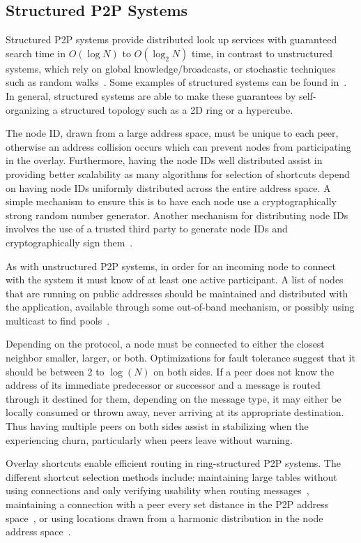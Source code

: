 \documentclass[conference]{IEEEtran}
\begin{document}
\subsection{Structured P2P Systems}
\label{structured_p2p}
Structured P2P systems provide distributed look up services with guaranteed
search time in $O(\log N)$ to $O(\log_2 N)$ time, in contrast to unstructured
systems, which rely on global knowledge/broadcasts, or stochastic techniques
such as random walks~\cite{unstructured_v_structured}.  Some examples of
structured systems can be found in~\cite{pastry, chord, symphony, kademlia,
can}.  In general, structured systems are able to make these guarantees by
self-organizing a structured topology such as a 2D ring or a hypercube.

The node ID, drawn from a large address space, must be unique to each peer,
otherwise an address collision occurs which can prevent nodes from participating
in the overlay.  Furthermore, having the node IDs well distributed assist in
providing better scalability as many algorithms for selection of shortcuts
depend on having node IDs uniformly distributed across the entire address space.
A simple mechanism to ensure this is to have each node use a cryptographically
strong random number generator.  Another mechanism for distributing node IDs
involves the use of a trusted third party to generate node IDs and
cryptographically sign them~\cite{secure_routing}.

As with unstructured P2P systems, in order for an incoming node to connect with
the system it must know of at least one active participant.  A list of nodes
that are running on public addresses should be maintained and distributed with
the application, available through some out-of-band mechanism, or possibly using
multicast to find pools~\cite{pastry}.

Depending on the protocol, a node must be connected to either the closest
neighbor smaller, larger, or both.  Optimizations for fault tolerance suggest
that it should be between 2 to $\log(N)$ on both sides.  If a peer does not
know the address of its immediate predecessor or successor and a message
is routed through it destined for them, depending on the message type, it may
either be locally consumed or thrown away, never arriving at its appropriate
destination.  Thus having multiple peers on both sides assist in stabilizing
when the experiencing churn, particularly when peers leave without warning.

Overlay shortcuts enable efficient routing in ring-structured P2P systems.  The
different shortcut selection methods include: maintaining large tables without
using connections and only verifying usability when routing
messages~\cite{pastry, kademlia}, maintaining a connection with a peer every
set distance in the P2P address space~\cite{chord}, or using locations drawn
from a harmonic distribution in the node address space~\cite{symphony}.
\end{document}
